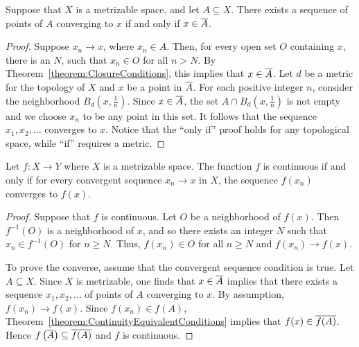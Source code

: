 \begin{theorem}
Suppose that $X$ is a metrizable space, and let $A \subseteq X$.
There exists a sequence of points of $A$ converging to $x$ if and only if $x \in \overline{A}$.
\end{theorem}
\begin{proof}
Suppose $x_n \rightarrow x$, where $x_n \in A$.
Then, for every open set $O$ containing $x$, there is an $N$, such that $x_n \in O$ for all $n>N$.
By Theorem~\ref{theorem:ClosureConditions}, this implies that $x \in \overline{A}$.
Let $d$ be a metric for the topology of $X$ and $x$ be a point in $\overline{A}$.
For each positive integer $n$, consider the neighborhood $B_d \left( x, \frac{1}{n} \right)$.
Since $x\in \overline{A}$, the set $A \cap B_d \left( x, \frac{1}{n} \right)$ is not empty and we choose $x_n$ to be any point in this set.
It follows that the sequence $x_1, x_2, \ldots$ converges to $x$.
Notice that the ``only if'' proof holds for any topological space, while ``if'' requires a metric.
\end{proof}

\begin{theorem}
\label{theorem:topology_limitpoint_closure}
Let $f \colon X \rightarrow Y$ where $X$ is a metrizable space.
The function $f$ is continuous if and only if for every convergent sequence $x_n \rightarrow x$ in $X$, the sequence $f(x_n)$ converges to $f(x)$.
\end{theorem}
\begin{proof}
Suppose that $f$ is continuous.
Let $O$ be a neighborhood of $f(x)$.
Then $f^{-1}(O)$ is a neighborhood of $x$, and so there exists an integer $N$ such that $x_n \in f^{-1}(O)$ for $n \geq N$.
Thus, $f(x_n) \in O$ for all $n \geq N$ and $f(x_n) \rightarrow f(x)$.

To prove the converse, assume that the convergent sequence condition is true.
Let $A \subseteq X$.
Since $X$ is metrizable, one finds that $x \in \overline{A}$ implies that there exists a sequence $x_1, x_2, \ldots$ of points of $A$ converging to $x$.
By assumption, $f(x_n) \rightarrow f(x)$.
Since $f(x_n) \in f(A)$, Theorem~\ref{theorem:ContinuityEquivalentConditions} implies that $f(x) \in \overline{f(A)}$.
Hence $f \left( \overline{A} \right) \subseteq \overline{f(A)}$ and $f$ is continuous.
\end{proof}

